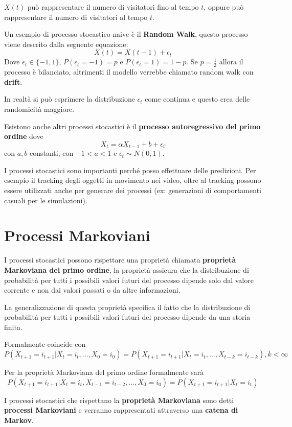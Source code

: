 \begin{esempio}
    $X(t)$ può rappresentare il numero di visitatori fino al tempo $t$, oppure 
    può rappresentare il numero di visitatori al tempo $t$.
\end{esempio}

Un esempio di processo stocastico naive è il \textbf{Random Walk}, questo processo viene descrito 
dalla seguente equazione:
$$X(t) = X(t-1) + \epsilon_t$$
Dove $\epsilon_t \in \{-1, 1\}$,  $P(\epsilon_t = -1) = p$ e $P(\epsilon_t = 1) = 1- p$.
Se $p=\frac{1}{2}$ allora il processo è bilanciato, altrimenti il modello verrebbe 
chiamato random walk con \textbf{drift}.

In realtà si può esprimere la distribuzione $\epsilon_t$ come continua e questo 
crea delle randomicità maggiore. 

Esistono anche altri processi stocastici è il \textbf{processo autoregressivo del primo ordine}
dove 
$$X_t = \alpha X_{t-1}+b+\epsilon_t$$
con $a,b$ constanti, con $-1<a<1$ e $\epsilon_t \sim N(0,1)$.

I processi stocastici sono importanti perché posso effettuare delle predizioni.
Per esempio il tracking degli oggetti in movimento nei video, oltre al tracking 
possono essere utilizzati anche per generare dei processi (ex: generazioni di comportamenti 
casuali per le simulazioni).

\section{Processi Markoviani}
I processi stocastici possono rispettare una proprietà chiamata \textbf{proprietà Markoviana del 
primo ordine}, la proprietà assicura che la distribuzione di probabilità per tutti 
i possibili valori futuri del processo dipende solo dal valore corrente e non dai 
valori passati o da altre informazioni. 

La generalizzazione di questa proprietà specifica il fatto che la distribuzione di probabilità per tutti 
i possibili valori futuri del processo dipende da una storia finita.

Formalmente coincide con 
$$P(X_{t+1} = i_{t+1 } | X_t =i_t, \dots, X_{0} = i_{0})=P(X_{t+1} = i_{t+1 } | X_t =i_t, \dots, X_{t-k} = i_{t-k}), k < \infty$$

Per la proprietà Markoviana del primo ordine formalmente sarà
$$P(X_{t+1} = i_{t+1 } | X_t =i_t, X_{t-1} = i_{t-2}, \dots, X_{0} = i_{0}) = P(X_{t+1} = i_{t+1 } | X_t =i_t)$$

I processi stocastici che rispettano la \textbf{proprietà Markoviana} sono detti 
\textbf{processi Markoviani} e verranno rappresentati attraverso una \textbf{catena di Markov}.

